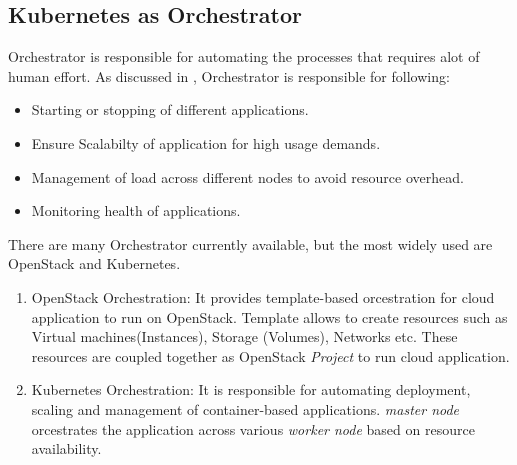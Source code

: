 \subsection{Kubernetes as Orchestrator}
\label{sec:k8s_orchestrator}
Orchestrator is responsible for automating the processes that requires alot of human effort. As discussed in \cite{containerjournal}, Orchestrator is responsible for following:
\begin{itemize}
  \item Starting or stopping of different applications.
  \item Ensure Scalabilty of application for high usage demands.
  \item Management of load across different nodes to avoid resource overhead.
  \item Monitoring health of applications.
\end{itemize}
There are many Orchestrator currently available, but the most widely used are OpenStack and Kubernetes.
\begin{enumerate}
  \item OpenStack Orchestration: It provides template-based orcestration for cloud application to run on OpenStack. Template allows to create resources such as Virtual machines(Instances), Storage (Volumes), Networks etc. These resources are coupled together as OpenStack \emph{Project} to run cloud application\cite{openstackOrchestrator}.
  \item Kubernetes Orchestration: It is responsible for automating deployment, scaling and management of container-based applications. \emph{master node} orcestrates the application across various \emph{worker node} based on resource availability.
\end{enumerate}
